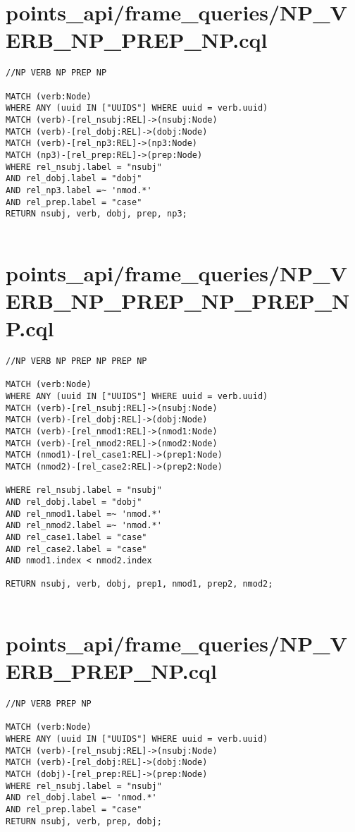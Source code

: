 \documentclass{article}
\begin{document}
\section*{points\_api/frame\_queries/NP\_VERB\_NP\_PREP\_NP.cql}
\begin{verbatim}
//NP VERB NP PREP NP

MATCH (verb:Node)
WHERE ANY (uuid IN ["UUIDS"] WHERE uuid = verb.uuid)
MATCH (verb)-[rel_nsubj:REL]->(nsubj:Node)
MATCH (verb)-[rel_dobj:REL]->(dobj:Node)
MATCH (verb)-[rel_np3:REL]->(np3:Node)
MATCH (np3)-[rel_prep:REL]->(prep:Node)
WHERE rel_nsubj.label = "nsubj"
AND rel_dobj.label = "dobj"
AND rel_np3.label =~ 'nmod.*'
AND rel_prep.label = "case"
RETURN nsubj, verb, dobj, prep, np3;


\end{verbatim}
\pagebreak

\section*{points\_api/frame\_queries/NP\_VERB\_NP\_PREP\_NP\_PREP\_NP.cql}
\begin{verbatim}
//NP VERB NP PREP NP PREP NP

MATCH (verb:Node)
WHERE ANY (uuid IN ["UUIDS"] WHERE uuid = verb.uuid)
MATCH (verb)-[rel_nsubj:REL]->(nsubj:Node)
MATCH (verb)-[rel_dobj:REL]->(dobj:Node)
MATCH (verb)-[rel_nmod1:REL]->(nmod1:Node)
MATCH (verb)-[rel_nmod2:REL]->(nmod2:Node)
MATCH (nmod1)-[rel_case1:REL]->(prep1:Node)
MATCH (nmod2)-[rel_case2:REL]->(prep2:Node)

WHERE rel_nsubj.label = "nsubj"
AND rel_dobj.label = "dobj"
AND rel_nmod1.label =~ 'nmod.*'
AND rel_nmod2.label =~ 'nmod.*'
AND rel_case1.label = "case"
AND rel_case2.label = "case"
AND nmod1.index < nmod2.index

RETURN nsubj, verb, dobj, prep1, nmod1, prep2, nmod2;


\end{verbatim}
\pagebreak

\section*{points\_api/frame\_queries/NP\_VERB\_PREP\_NP.cql}
\begin{verbatim}
//NP VERB PREP NP

MATCH (verb:Node)
WHERE ANY (uuid IN ["UUIDS"] WHERE uuid = verb.uuid)
MATCH (verb)-[rel_nsubj:REL]->(nsubj:Node)
MATCH (verb)-[rel_dobj:REL]->(dobj:Node)
MATCH (dobj)-[rel_prep:REL]->(prep:Node)
WHERE rel_nsubj.label = "nsubj"
AND rel_dobj.label =~ 'nmod.*'
AND rel_prep.label = "case"
RETURN nsubj, verb, prep, dobj;


\end{verbatim}
\pagebreak
\end{document}
